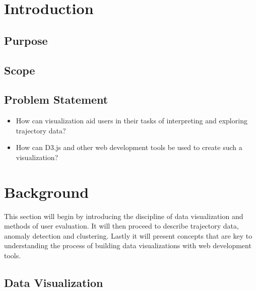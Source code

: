 \documentclass{article}
\title{}
\author{Christina Sonebo, Joel Ekelöf}
\date{February 2018}
\begin{document}
\maketitle

\begin{abstract}
    
\end{abstract}

\newpage

\tableofcontents

\newpage

\section{Introduction}
\subsection{Purpose}
\subsection{Scope}
\subsection{Problem Statement}

\begin{itemize}
    \item How can visualization aid users in their tasks of interpreting and exploring trajectory data? 
    \item How can D3.js and other web development tools be used to create such a visualization? 
\end{itemize}

\section{Background}


This section will begin by introducing the discipline of data visualization and methods of user evaluation. It will then proceed to describe trajectory data, anomaly detection and clustering. Lastly it will present concepts that are key to understanding the process of building data visualizations with web development tools. 


\subsection{Data Visualization}
\end{document}
